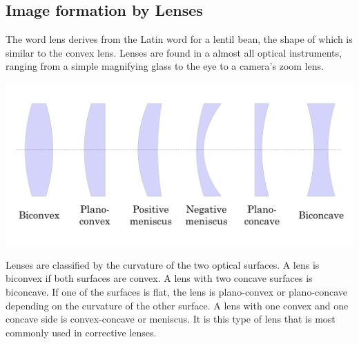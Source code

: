 \documentclass[11pt]{article}
\begin{document}
	\subsection*{Image formation by Lenses}
	The word lens derives from the Latin word for a lentil bean, the shape of which is similar to the convex lens. Lenses are found in a almost all optical instruments, ranging from a simple magnifying glass to the eye to a camera’s zoom lens.
	\begin{center}
		\includegraphics[scale=0.3]{lenses}
	\end{center}
	Lenses are classified by the curvature of the two optical surfaces. A lens is biconvex if both surfaces are convex. A lens with two concave surfaces is biconcave. If one of the surfaces is flat, the lens is plano-convex or plano-concave depending on the curvature of the other surface. A lens with one convex and one concave side is convex-concave or meniscus. It is this type of lens that is most commonly used in corrective lenses. 
\end{document}
